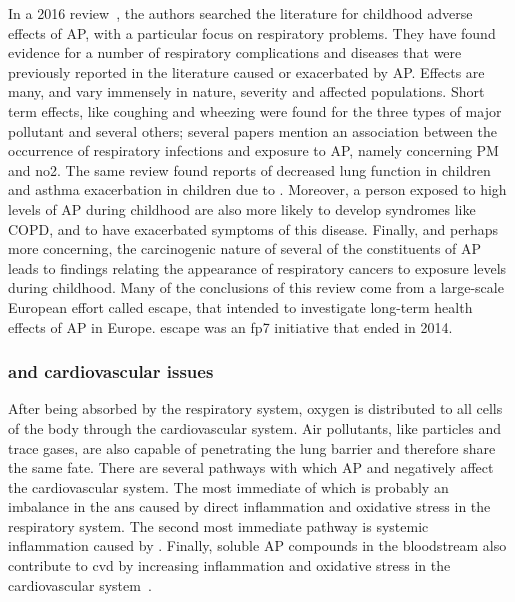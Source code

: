 In a 2016 review~\cite{Goldizen2016}, the authors searched the
literature for childhood adverse effects of \gls{AP}, with a particular
focus on respiratory problems. They have found evidence for a number of
respiratory complications and diseases that were previously reported in
the literature caused or exacerbated by \gls{AP}. Effects are many, and
vary immensely in nature, severity and affected populations. Short term
effects, like coughing and wheezing were found for the three types of
major pollutant and several others; several papers mention an
association between the occurrence of respiratory infections and
exposure to \gls{AP}, namely concerning \gls{PM} and \gls{no2}.  The
same review found reports of decreased lung function in children and
asthma exacerbation in children due to . Moreover, a person
exposed to high levels of \gls{AP} during childhood are also more likely
to develop syndromes like \gls{COPD}, and to have exacerbated symptoms
of this disease. Finally, and perhaps more concerning, the carcinogenic
nature of several of the constituents of \gls{AP} leads to findings
relating the appearance of respiratory cancers to exposure levels during
childhood. Many of the conclusions of this review come from a
large-scale European effort called \gls{escape}, that intended to
investigate long-term health effects of \gls{AP} in Europe. \gls{escape}
was an \gls{fp7} initiative that ended in 2014.

\subsubsection{ and cardiovascular issues}%
\label{ssub:ap_and_cardiovascular_issues}

After being absorbed by the respiratory system, oxygen is distributed to
all cells of the body through the cardiovascular system. Air pollutants,
like particles and trace gases, are also capable of penetrating the lung
barrier and therefore share the same fate. There are several pathways
with which \gls{AP} and negatively affect the cardiovascular system. The
most immediate of which is probably an imbalance in the \gls{ans} caused
by direct inflammation and oxidative stress in the respiratory system.
The second most immediate pathway is systemic inflammation caused by
. Finally, soluble \gls{AP} compounds in the bloodstream
also contribute to \gls{cvd} by increasing inflammation and oxidative
stress in the cardiovascular system~\cite{Brook2008, Vallero2014}.

